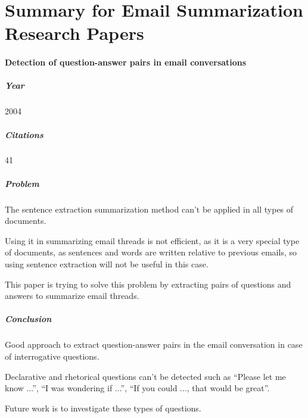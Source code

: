 \chapter{Summary for Email Summarization Research Papers} %

\label{AppendixB} %


\subsubsection{Detection of question-answer pairs in email conversations \cite{LOKESH04}}

\paragraph{Year} 2004
\paragraph{Citations} 41

\paragraph{Problem}
\begin{my_itemize}
  \item The sentence extraction summarization method can't be applied in all 
	types of documents.
  \item Using it in summarizing email threads is not efficient, as it is a very
	special type of documents, as sentences and words are written relative 
	to previous emails, so using sentence extraction will not be useful in this
	case.
  \item This paper is trying to solve this problem by extracting pairs of 
	questions and answers to summarize email threads.
\end{my_itemize}

\paragraph{Conclusion}
\begin{my_itemize}
  \item Good approach to extract question-answer pairs in the email conversation 
	in case of interrogative questions.
  \item Declarative and rhetorical questions can't be detected such as 
	``Please let  me know ...'', ``I was wondering if ...'', 
	``If you could ..., that would be great''.
  \item Future work is to investigate these types of questions.
\end{my_itemize}



